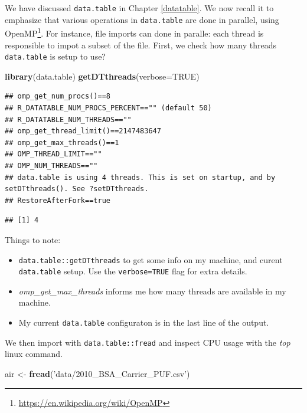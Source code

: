 \documentclass[]{book}
\newenvironment{Shaded}{\begin{snugshade}}{\end{snugshade}}
\newcommand{\DataTypeTok}[1]{\textcolor[rgb]{0.13,0.29,0.53}{#1}}
\newcommand{\KeywordTok}[1]{\textcolor[rgb]{0.13,0.29,0.53}{\textbf{#1}}}
\newcommand{\NormalTok}[1]{#1}
\newcommand{\OtherTok}[1]{\textcolor[rgb]{0.56,0.35,0.01}{#1}}
\newcommand{\StringTok}[1]{\textcolor[rgb]{0.31,0.60,0.02}{#1}}
\providecommand{\tightlist}{%
  \setlength{\itemsep}{0pt}\setlength{\parskip}{0pt}}
\renewcommand{\href}[2]{#2\footnote{\url{#1}}}
\theoremstyle{definition}
\theoremstyle{definition}
\theoremstyle{definition}
\theoremstyle{remark}
\begin{document}
We have discussed \texttt{data.table} in Chapter \ref{datatable}.
We now recall it to emphasize that various operations in \texttt{data.table} are done in parallel, using \href{https://en.wikipedia.org/wiki/OpenMP}{OpenMP}.
For instance, file imports can done in paralle: each thread is responsible to impot a subset of the file.
First, we check how many threads \texttt{data.table} is setup to use?

\begin{Shaded}
\begin{Highlighting}[]
\KeywordTok{library}\NormalTok{(data.table)}
\KeywordTok{getDTthreads}\NormalTok{(}\DataTypeTok{verbose=}\OtherTok{TRUE}\NormalTok{) }
\end{Highlighting}
\end{Shaded}

\begin{verbatim}
## omp_get_num_procs()==8
## R_DATATABLE_NUM_PROCS_PERCENT=="" (default 50)
## R_DATATABLE_NUM_THREADS==""
## omp_get_thread_limit()==2147483647
## omp_get_max_threads()==1
## OMP_THREAD_LIMIT==""
## OMP_NUM_THREADS==""
## data.table is using 4 threads. This is set on startup, and by setDTthreads(). See ?setDTthreads.
## RestoreAfterFork==true
\end{verbatim}

\begin{verbatim}
## [1] 4
\end{verbatim}

Things to note:

\begin{itemize}
\tightlist
\item
  \texttt{data.table::getDTthreads} to get some info on my machine, and curent \texttt{data.table} setup. Use the \texttt{verbose=TRUE} flag for extra details.
\item
  \emph{omp\_get\_max\_threads} informs me how many threads are available in my machine.
\item
  My current \texttt{data.table} configuraton is in the last line of the output.
\end{itemize}

We then import with \texttt{data.table::fread} and inspect CPU usage with the \emph{top} linux command.

\begin{Shaded}
\begin{Highlighting}[]
\NormalTok{air <-}\StringTok{ }\KeywordTok{fread}\NormalTok{(}\StringTok{'data/2010_BSA_Carrier_PUF.csv'}\NormalTok{)}
\end{Highlighting}
\end{Shaded}
\end{document}
